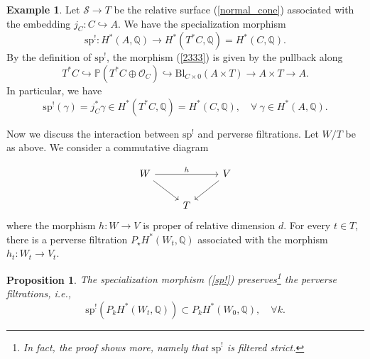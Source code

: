 \documentclass[11pt]{amsart}
\theoremstyle{plain}
\newtheorem{prop}[thm]{Proposition}
\theoremstyle{definition}
\newtheorem{example}[thm]{Example}
\theoremstyle{remark}
\newcommand{\BP}{{\mathbb{P}}}
\newcommand{\BQ}{{\mathbb{Q}}}
\newcommand{\CO}{{\mathcal O}}
\newcommand{\CS}{{\mathcal S}}
\begin{document}
\begin{example}\label{example1}
Let $\CS \to T$ be the relative surface (\ref{normal_cone}) associated with the embedding $j_C: C \hookrightarrow A$. We have the specialization morphism
\begin{equation}\label{2333}
\mathrm{sp}^!: H^*(A, \BQ) \to H^*(T^*C, \BQ) = H^*(C, \BQ).
\end{equation}
By the definition of $\mathrm{sp}^!$, the morphism (\ref{2333}) is given by the pullback along
\[
T^*C  \hookrightarrow \BP(T^*C \oplus \CO_C) \hookrightarrow \mathrm{Bl}_{C\times 0}(A \times T) \to A\times T \to A.
\]
In particular, we have
\[
\mathrm{sp}^!(\gamma)  = j_C^* \gamma \in H^*(T^*C, \BQ) = H^*(C, \BQ),\quad \forall~ \gamma \in H^*(A, \BQ). 
\]
\end{example}

Now we discuss the interaction between $\mathrm{sp}^!$ and perverse filtrations. Let $W/T$ be as above. We consider a commutative diagram

\begin{equation*}
\begin{tikzcd}
W \ar [rr,"h"]\ar[rd]& & V\ar[ld]\\
 &T&
\end{tikzcd}
\end{equation*}  
where the morphism $h: W \to V$ is proper of relative dimension $d$. For every $t \in T$, there is a perverse filtration $P_\star H^*(W_t, \BQ)$ associated with the morphism $h_t : W_t \to V_t$.

\begin{prop}\label{Prop3.1}
The specialization morphism (\ref{sp!}) preserves\footnote{{In fact, the proof shows more, namely that $\mathrm{sp}^!$ is filtered strict.}} the perverse filtrations, \emph{i.e.}, 
\[
\mathrm{sp}^!\left( P_kH^*(W_t, \BQ ) \right) \subset P_k H^*(W_0, \BQ), \quad \forall k.
\]
\end{prop}
\end{document}
